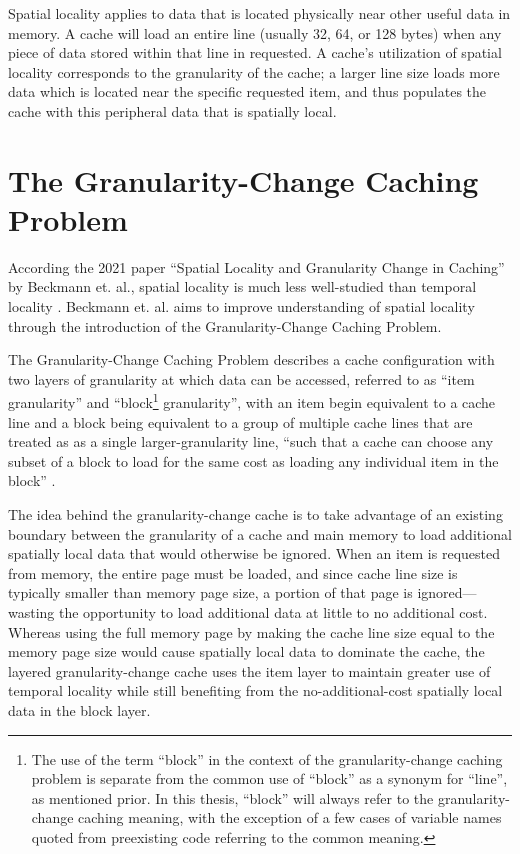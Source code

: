 \documentclass[12pt,twoside]{reedthesis}
\begin{document}
	Spatial locality applies to data that is located physically near other useful data in memory. A cache will load an entire line (usually 32, 64, or 128 bytes) when any piece of data stored within that line in requested. A cache's utilization of spatial locality corresponds to the granularity of the cache; a larger line size loads more data which is located near the specific requested item, and thus populates the cache with this peripheral data that is spatially local.

\section{The Granularity-Change Caching Problem}

According the 2021 paper ``Spatial Locality and Granularity Change in Caching'' by Beckmann et. al., spatial locality is much less well-studied than temporal locality  \cite{beckmann}. Beckmann et. al. aims to improve understanding of spatial locality through the introduction of the Granularity-Change Caching Problem.

The Granularity-Change Caching Problem describes a cache configuration with two layers of granularity at which data can be accessed, referred to as ``item granularity'' and ``block\footnote{The use of the term ``block'' in the context of the granularity-change caching problem is separate from the common use of ``block'' as a synonym for ``line'', as mentioned prior. In this thesis, ``block'' will always refer to the granularity-change caching meaning, with the exception of a few cases of variable names quoted from preexisting code referring to the common meaning.} granularity'', with an item begin equivalent to a cache line and a block being equivalent to a group of multiple cache lines that are treated as as a single larger-granularity line, ``such that a cache can choose any subset of a block to load for the same cost as loading any individual item in the block'' \cite{beckmann}.

The idea behind the granularity-change cache is to take advantage of an existing boundary between the granularity of a cache and main memory to load additional spatially local data that would otherwise be ignored. When an item is requested from memory, the entire page must be loaded, and since cache line size is typically smaller than memory page size, a portion of that page is ignored---wasting the opportunity to load additional data at little to no additional cost. Whereas using the full memory page by making the cache line size equal to the memory page size would cause spatially local data to dominate the cache, the layered granularity-change cache uses the item layer to maintain greater use of temporal locality while still benefiting from the no-additional-cost spatially local data in the block layer.
\end{document}
